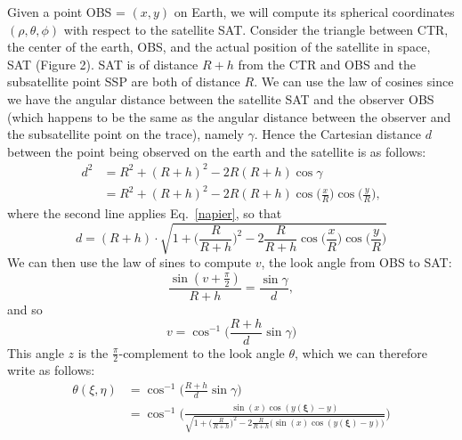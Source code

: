 \documentclass{article}
\begin{document}
Given a point OBS = $(x,y)$ on Earth, we will compute its spherical coordinates $(\rho, \theta, \phi)$ with respect to the satellite SAT. Consider the triangle between CTR, the center of the earth, OBS, and the actual position of the satellite in space, SAT (Figure 2). SAT is of distance $R+h$ from the CTR and OBS and the subsatellite point SSP are both of distance $R$. We can use the law of cosines since we have the angular distance between the satellite SAT and the observer OBS (which happens to be the same as the angular distance between the observer and the subsatellite point on the trace), namely $\gamma$. Hence the Cartesian distance $d$ between the point being observed on the earth and the satellite is as follows:
\begin{align*}
    d^2 &= R^2 + (R+h)^2 -2R(R+h)\cos\gamma\\
    &= R^2 + (R+h)^2 -2R(R+h) \cos \big(\frac{x}{R}\big)\cos \big(\frac{y}{R}\big),
\end{align*} where the second line applies Eq.~\eqref{napier}, so that 
\begin{equation}    
    d = (R+h) \cdot \sqrt{1 + \bigg(\frac{R}{R+h}\bigg)^2 - 2 \frac{R}{R+h}\cos \big(\frac{x}{R}\big)\cos \big(\frac{y}{R}\big)}
\end{equation}
We can then use the law of sines to compute $v$, the look angle from OBS to SAT:
\begin{equation*}
    \frac{\sin (v+\frac{\pi}{2})}{R+h} = \frac{\sin \gamma}{d},
\end{equation*}
and so 
\begin{equation}
v = \cos^{-1}\bigg(\frac{R+h}{d} \sin \gamma\bigg)
\end{equation}
This angle $z$ is the $\frac{\pi}{2}$-complement to the look angle $\theta$, which we can therefore write as follows:
\begin{align}
    \theta(\xi, \eta) &= \cos^{-1}\bigg(\frac{R+h}{d} \sin \gamma\bigg) \\
    & = \cos^{-1}\bigg(\frac{\sin(x) \cos(y(\bm{\xi}) - y)}{\sqrt{1 + \bigg(\frac{R}{R+h}\bigg)^2 - 2 \frac{R}{R+h}\big(\sin(x) \cos(y(\bm{\xi}) - y)\big)}}
\bigg)
\end{align}
\end{document}
